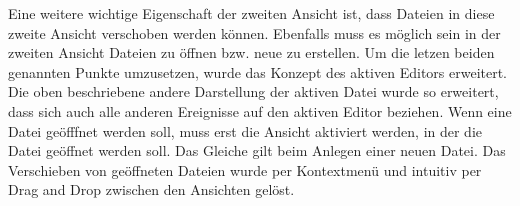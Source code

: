 Eine weitere wichtige Eigenschaft der zweiten Ansicht ist, dass Dateien in diese
zweite Ansicht verschoben werden können. Ebenfalls muss es möglich sein in der
zweiten Ansicht Dateien zu öffnen bzw. neue zu erstellen. Um die letzen beiden
genannten Punkte umzusetzen, wurde das Konzept des aktiven Editors erweitert. Die
oben beschriebene andere Darstellung der aktiven Datei wurde so erweitert, dass
sich auch alle anderen Ereignisse auf den aktiven Editor beziehen. Wenn eine
Datei geöfffnet werden soll, muss erst die Ansicht aktiviert werden, in der die
Datei geöffnet werden soll. Das Gleiche gilt beim Anlegen einer neuen Datei. Das
Verschieben von geöffneten Dateien wurde per Kontextmenü und intuitiv per Drag
and Drop zwischen den Ansichten gelöst.\vspace{10pt}
